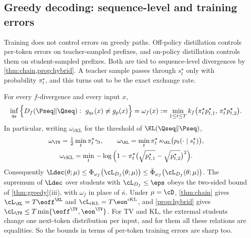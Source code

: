 \subsection{Greedy decoding: sequence-level and training errors}

Training does not control errors on greedy paths. Off-policy distillation controls per-token errors on
teacher-sampled prefixes, and on-policy distillation controls them on student-sampled prefixes. Both are
tied to sequence-level divergences by \cref{thm:chain,prop:hybrid}. A teacher sample passes through
$s^\star_t$ only with probability $\pi^\star_t$, and this turns out to be the exact exchange rate.

\begin{theorem}\label{thm:greedy-seq}
\Pv\Ck For every $f$-divergence and every input $x$,
\[
\inf_{q_\theta}\Big\{D_f(\Pseq\|\Qseq):\ g_{q_\theta}(x)\ne g_p(x)\Big\}=\omega_f(x):=\min_{1\le t\le T}k_f\big(\pi^\star_tp^\star_{t,1},\,\pi^\star_tp^\star_{t,2}\big).
\]
In particular, writing $\omega_{\mathrm{rKL}}$ for the threshold of $\KL(\Qseq\|\Pseq)$,
\begin{gather*}
\omega_{\TV}=\tfrac12\min_t\pi^\star_t\gamma_t,\qquad
\omega_{\KL}=\min_t\pi^\star_t\,\kappa_{\KL}\big(p_t(\cdot\mid s^\star_t)\big),\\
\omega_{\mathrm{rKL}}=\min_t\,-\log\Big(1-\pi^\star_t\big(\sqrt{p^\star_{t,1}}-\sqrt{p^\star_{t,2}}\big)^2\Big).
\end{gather*}
Consequently $\Ldec(\theta;\mu)\le\Phi_{\omega_f}\big(\cL_{D_f}(\theta;\mu)\big)\le\bar\Phi_{\omega_f}\big(\cL_{D_f}(\theta;\mu)\big)$. The
supremum of $\Ldec$ over students with $\cL_{D_f}\le\eps$ obeys the two-sided bound of \cref{thm:greedy}(iii),
with $\omega_f$ in place of $\bar\kappa$. Under $\mu=\cD$, \cref{thm:chain} gives $\cL_{\KL}=T\eoff^{\KL}$ and
$\cL_{\mathrm{rKL}}=T\eon^{\mathrm{rKL}}$, and \cref{prop:hybrid} gives $\cL_{\TV}\le T\min\{\eoff^{\TV},\eon^{\TV}\}$. For TV and
KL, the extremal students change one next-token distribution per input, and for them all these relations
are equalities. So the bounds in terms of per-token training errors are sharp too.
\end{theorem}
